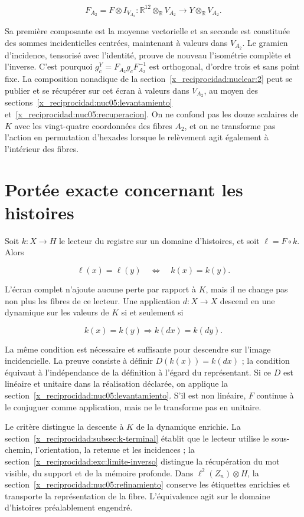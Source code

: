\[
F_{A_2}=F\otimes I_{V_{A_2}}:
\mathbb R^{12}\otimes_{\mathbb R}V_{A_2}
\longrightarrow Y\otimes_{\mathbb R}V_{A_2}.
\]

Sa première composante est la moyenne vectorielle et sa seconde est constituée des sommes incidentielles centrées, maintenant à valeurs dans \(V_{A_2}\). Le gramien d’incidence, tensorisé avec l’identité, prouve de nouveau l’isométrie complète et l’inverse. C’est pourquoi \(g_c^Y=F_{A_2}g_cF_{A_2}^{-1}\) est orthogonal, d’ordre trois et sans point fixe. La composition nonadique de la section~\ref{x_reciprocidad:nuclear:2} peut se publier et se récupérer sur cet écran à valeurs dans \(V_{A_2}\), au moyen des sections~\ref{x_reciprocidad:nuc05:levantamiento} et~\ref{x_reciprocidad:nuc05:recuperacion}. On ne confond pas les douze scalaires de \(K\) avec les vingt-quatre coordonnées des fibres \(A_2\), et on ne transforme pas l’action en permutation d’hexades lorsque le relèvement agit également à l’intérieur des fibres.

\section{Portée exacte concernant les histoires}

Soit \(k:X\to H\) le lecteur du registre sur un domaine d’histoires, et soit \(\ell=F\circ k\). Alors

\[
\ell(x)=\ell(y)\quad\Longleftrightarrow\quad k(x)=k(y).
\]

L’écran complet n’ajoute aucune perte par rapport à \(K\), mais il ne change pas non plus les fibres de ce lecteur. Une application \(d:X\to X\) descend en une dynamique sur les valeurs de \(K\) si et seulement si

\[
k(x)=k(y)\Longrightarrow k(d x)=k(d y).
\]

La même condition est nécessaire et suffisante pour descendre sur l’image incidencielle. La preuve consiste à définir \(D(k(x))=k(dx)\) ; la condition équivaut à l’indépendance de la définition à l’égard du représentant. Si ce \(D\) est linéaire et unitaire dans la réalisation déclarée, on applique la section~\ref{x_reciprocidad:nuc05:levantamiento}. S’il est non linéaire, \(F\) continue à le conjuguer comme application, mais ne le transforme pas en unitaire.

Le critère distingue la descente à \(K\) de la dynamique enrichie. La section~\ref{x_reciprocidad:subsec:k-terminal} établit que le lecteur utilise le sous-chemin, l’orientation, la retenue et les incidences ; la section~\ref{x_reciprocidad:exc:limite-inverso} distingue la récupération du mot visible, du support et de la mémoire profonde. Dans \(\ell^2(Z_n)\otimes H\), la section~\ref{x_reciprocidad:nuc05:refinamiento} conserve les étiquettes enrichies et transporte la représentation de la fibre. L’équivalence agit sur le domaine d’histoires préalablement engendré.


